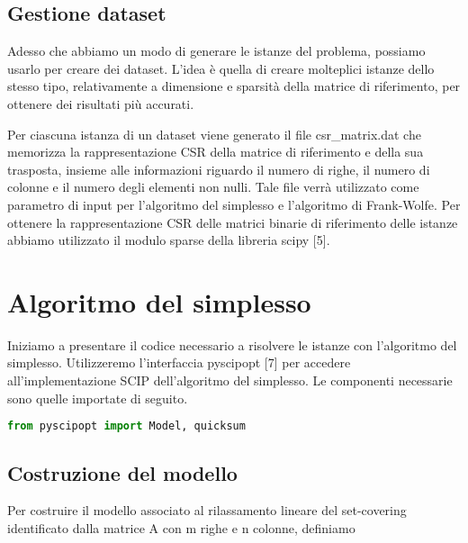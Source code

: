 \subsection{Gestione dataset}
Adesso che abbiamo un modo di generare le istanze del problema, possiamo usarlo per creare dei dataset. L'idea è quella
di creare molteplici istanze dello stesso tipo, relativamente a dimensione e sparsità della matrice di riferimento, per
ottenere dei risultati più accurati.

Per ciascuna istanza di un dataset viene generato il file {\jbm csr\_matrix.dat} che memorizza la rappresentazione CSR
della matrice di riferimento e della sua trasposta, insieme alle informazioni riguardo il numero di righe, il numero di
colonne e il numero degli elementi non nulli. Tale file verrà utilizzato come parametro di input per l'algoritmo del
simplesso e l'algoritmo di Frank-Wolfe. Per ottenere la rappresentazione CSR delle matrici binarie di riferimento delle
istanze abbiamo utilizzato il modulo sparse della libreria scipy [5].


\section{Algoritmo del simplesso}
Iniziamo a presentare il codice necessario a risolvere le istanze con l'algoritmo del simplesso. Utilizzeremo
l'interfaccia pyscipopt [7] per accedere all'implementazione SCIP dell'algoritmo del simplesso. Le componenti necessarie
sono quelle importate di seguito.

\begin{inline}
\begin{lstlisting}[style = style2, language=python]
from pyscipopt import Model, quicksum
\end{lstlisting}
\end{inline}

\subsection{Costruzione del modello}\label{sec:buildmodel}
Per costruire il modello associato al rilassamento lineare del set-covering identificato dalla matrice {\jbm A} con
{\jbm m} righe e {\jbm n} colonne, definiamo

